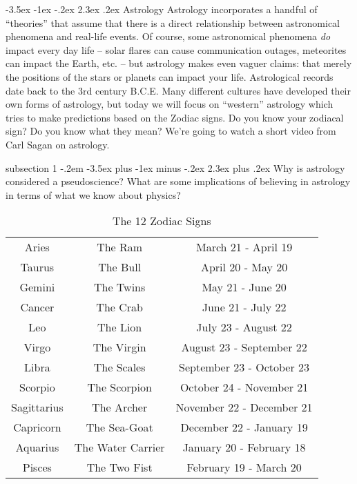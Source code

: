 \documentclass[12pt]{article}
\makeatletter
\newenvironment{problem}{\@startsection
       {subsection}
       {1}
       {-.2em}
       {-3.5ex plus -1ex minus -.2ex}
       {2.3ex plus .2ex}
       {\pagebreak[3]%
       \normalsize\bf\noindent{Problem }
       }
       }
       {%
       }
\renewcommand\section{\@startsection{section}{1}{\z@}%
                                  {-3.5ex \@plus -1ex \@minus -.2ex}%
                                  {2.3ex \@plus.2ex}%
                                  {\normalfont\large\bfseries}}
\makeatother
\begin{document}
\section{Astrology}
Astrology incorporates a handful of ``theories'' that assume that there is a direct relationship between astronomical phenomena and real-life events. Of course, some astronomical phenomena \emph{do} impact every day life -- solar flares can cause communication outages, meteorites can impact the Earth, etc. -- but astrology makes even vaguer claims: that merely the positions of the stars or planets can impact your life. Astrological records date back to the 3rd century B.C.E. Many different cultures have developed their own forms of astrology, but today we will focus on ``western'' astrology which tries to make predictions based on the Zodiac signs. Do you know your zodiacal sign? Do you know what they mean? We're going to watch a short video from Carl Sagan on astrology.

\begin{problem}{ }
	Why is astrology considered a pseudoscience? What are some implications of believing in astrology in terms of what we know about physics?
\end{problem}

\begin{table}[ht]
\caption{The 12 Zodiac Signs}
\centering
\begin{tabular}{ c c c }
\hline \hline
Aries & The Ram & March 21 - April 19 \\
Taurus & The Bull & April 20 - May 20 \\
Gemini & The Twins & May 21 - June 20 \\
Cancer & The Crab & June 21 - July 22 \\
Leo & The Lion & July 23 - August 22 \\
Virgo & The Virgin & August 23 - September 22 \\
Libra & The Scales & September 23 - October 23 \\
Scorpio & The Scorpion & October 24 - November 21 \\
Sagittarius & The Archer & November 22 - December 21 \\
Capricorn & The Sea-Goat & December 22 - January 19 \\
Aquarius & The Water Carrier & January 20 - February 18 \\
Pisces & The Two Fist & February 19 - March 20 \\
\hline
\end{tabular}
\end{table}
\end{document}
